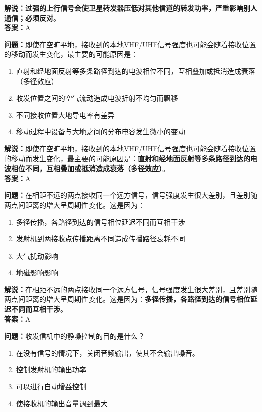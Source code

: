 \textbf{解说：过强的上行信号会使卫星转发器压低对其他信道的转发功率，严重影响别人通信；必须反对}。\\\textbf{答案：}A%


\textbf{问题：}即使在空旷平地，接收到的本地VHF/UHF信号强度也可能会随着接收位置的移动而发生变化，最主要的可能原因是：

\begin{enumerate}[label=\Alph*), leftmargin=1cm]
	\item 直射和经地面反射等多条路径到达的电波相位不同，互相叠加或抵消造成衰落（多径效应）
	\item 收发位置之间的空气流动造成电波折射不均匀而飘移
	\item 不同接收位置大地导电率有差异
	\item 移动过程中设备与大地之间的分布电容发生微小的变动
\end{enumerate}

\textbf{解说：}即使在空旷平地，接收到的本地VHF/UHF信号强度也可能会随着接收位置的移动而发生变化，最主要的可能原因是：\textbf{直射和经地面反射等多条路径到达的电波相位不同，互相叠加或抵消造成衰落（多径效应）}。\\\textbf{答案：}A%


\textbf{问题：}在相距不远的两点接收同一个远方信号，信号强度发生很大差别，且差别随两点间距离的增大呈周期性变化。这是因为：

\begin{enumerate}[label=\Alph*), leftmargin=1cm]
	\item 多径传播，各路径到达的信号相位延迟不同而互相干涉
	\item 发射机到两接收点传播距离不同造成传播路径衰耗不同
	\item 大气扰动影响
	\item 地磁影响影响
\end{enumerate}

\textbf{解说：}在相距不远的两点接收同一个远方信号，信号强度发生很大差别，且差别随两点间距离的增大呈周期性变化。这是因为：\textbf{多径传播，各路径到达的信号相位延迟不同而互相干涉}。\\\textbf{答案：}A%


\textbf{问题：}收发信机中的静噪控制的目的是什么？

\begin{enumerate}[label=\Alph*), leftmargin=1cm]
	\item 在没有信号的情况下，关闭音频输出，使其不会输出噪音。
	\item 控制发射机的输出功率
	\item 可以进行自动增益控制
	\item 使接收机的输出音量调到最大
\end{enumerate}

